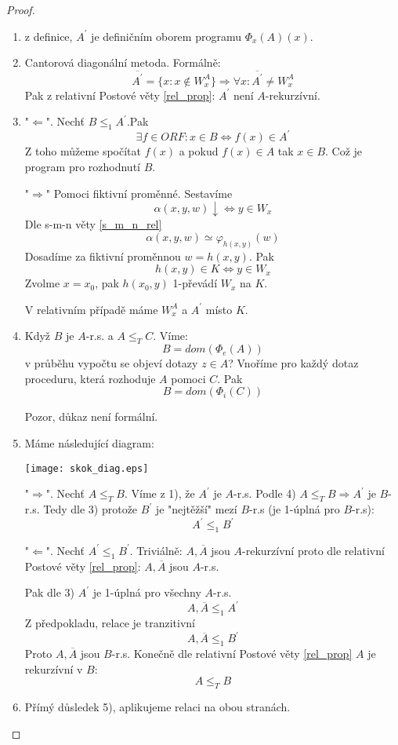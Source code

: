 \begin{proof}
	\begin{enumerate}
		\item z definice, $A^{\prime}$ je definičním oborem programu $\Phi_x(A)(x)$.
		\item Cantorová diagonální metoda. Formálně:
			\[ \overline{A^{\prime}} = \{ x : x \notin W_x^A \} \Rightarrow \forall x: \overline{A^{\prime}} \neq W_x^A \]
			Pak z relativní Postové věty \cref{rel_prop}: $A^{\prime}$ není $A$-rekurzívní.
		\item "$\Leftarrow$". Nechť $B \leq_1 A^{\prime}$.Pak
			\[ \exists f \in ORF: x \in B \iff f(x) \in A^{\prime} \]
			Z toho můžeme spočítat $f(x)$ a pokud $f(x) \in A$ tak $x \in B$.
			Což je program pro rozhodnutí $B$.

			"$\Rightarrow$" Pomoci fiktivní proměnné.
			Sestavíme
			\[ \alpha(x, y, w) \downarrow \iff y \in W_x \]
			Dle s-m-n věty \cref{s_m_n_rel}
			\[ \alpha(x, y, w) \simeq \varphi_{h(x, y)}(w) \]
			Dosadíme za fiktivní proměnnou $w = h(x, y)$.
			Pak
			\[ h(x, y) \in K \iff y \in W_x \]
			Zvolme $x = x_0$, pak $h(x_0, y)$ 1-převádí $W_x$ na $K$.

			V relativním případě máme $W_x^A$ a $A^{\prime}$ místo $K$.
		\item Když $B$ je $A$-r.s. a $A \leq_T C$. Víme:
			\[ B = dom(\Phi_e(A)) \]
			v průběhu vypočtu se objeví dotazy $z \in A$?
			Vnoříme pro každý dotaz proceduru, která rozhoduje $A$ pomoci $C$.
			Pak
			\[ B = dom(\Phi_i(C)) \]

			Pozor, důkaz není formální.
		\item Máme následující diagram:

		\texttt{[image: skok\_diag.eps]}

		"$\Rightarrow$". Nechť $A \leq_T B$.
		Víme z 1), že $A^{\prime}$ je $A$-r.s.
		Podle 4) $A \leq_T B \Rightarrow A^{\prime}$ je $B$-r.s.
		Tedy dle 3) protože $B^{\prime}$ je "nejtěžší" mezí $B$-r.s (je 1-úplná pro $B$-r.s):
		\[ A^{\prime} \leq_1 B^{\prime} \]

		"$\Leftarrow$". Nechť $A^{\prime} \leq_1 B^{\prime}$.
		Triviálně: $A, \overline{A}$ jsou $A$-rekurzívní proto dle relativní Postové věty \cref{rel_prop}:
		$A, \overline{A}$ jsou $A$-r.s.

		Pak dle 3) $A^{\prime}$ je 1-úplná pro všechny $A$-r.s.
		\[ A, \overline{A} \leq_1 A^{\prime} \]
		Z předpokladu, relace je tranzitivní
		\[ A, \overline{A} \leq_1 B^{\prime} \]
		Proto $A, \overline{A}$ jsou $B$-r.s.
		Konečně dle relativní Postové věty \cref{rel_prop} $A$ je rekurzívní v $B$:
		\[ A \leq_T B \]

		\item Přímý důsledek 5), aplikujeme relaci na obou stranách.

	\end{enumerate}
\end{proof}

